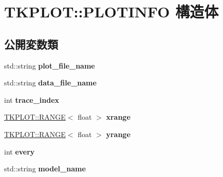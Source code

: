 \hypertarget{struct_t_k_p_l_o_t_1_1_p_l_o_t_i_n_f_o}{}\section{T\+K\+P\+L\+OT\+:\+:P\+L\+O\+T\+I\+N\+FO 構造体}
\label{struct_t_k_p_l_o_t_1_1_p_l_o_t_i_n_f_o}
\subsection*{公開変数類}
\begin{DoxyCompactItemize}
\item 
\mbox{\label{struct_t_k_p_l_o_t_1_1_p_l_o_t_i_n_f_o_ac1dae6b6cd429f4276f5a4491af8c24d}} 
std\+::string {\bfseries plot\+\_\+file\+\_\+name}
\item 
\mbox{\label{struct_t_k_p_l_o_t_1_1_p_l_o_t_i_n_f_o_a18a67313f8bb54564f35f6e6eddef899}} 
std\+::string {\bfseries data\+\_\+file\+\_\+name}
\item 
\mbox{\label{struct_t_k_p_l_o_t_1_1_p_l_o_t_i_n_f_o_a48ef8281322bf15a1e48cca923d34eeb}} 
int {\bfseries trace\+\_\+index}
\item 
\mbox{\label{struct_t_k_p_l_o_t_1_1_p_l_o_t_i_n_f_o_a13b0235f3544b9d875af92ce3ac247ab}} 
\hyperlink{class_t_k_p_l_o_t_1_1_r_a_n_g_e}{T\+K\+P\+L\+O\+T\+::\+R\+A\+N\+GE}$<$ float $>$ {\bfseries xrange}
\item 
\mbox{\label{struct_t_k_p_l_o_t_1_1_p_l_o_t_i_n_f_o_a5ce7809252eb582e3fae0a554bcdb65d}} 
\hyperlink{class_t_k_p_l_o_t_1_1_r_a_n_g_e}{T\+K\+P\+L\+O\+T\+::\+R\+A\+N\+GE}$<$ float $>$ {\bfseries yrange}
\item 
\mbox{\label{struct_t_k_p_l_o_t_1_1_p_l_o_t_i_n_f_o_ab210e72c1f8d1e3d930b003f47568d3e}} 
int {\bfseries every}
\item 
\mbox{\label{struct_t_k_p_l_o_t_1_1_p_l_o_t_i_n_f_o_ae98bf84fdf14074b4f7804f0617aa902}} 
std\+::string {\bfseries model\+\_\+name}

\end{DoxyCompactItemize}
